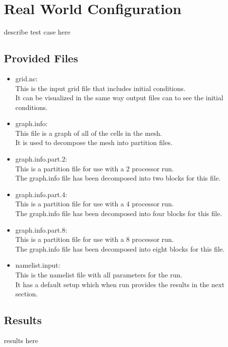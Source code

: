 \section{Real World Configuration}
\label{sec:realWorld_description}
describe test case here

\subsection{Provided Files}
\label{subsec:realWorld_files}

\begin{itemize}
	\item grid.nc: \\
		This is the input grid file that includes initial conditions.  \\
		It can be visualized in the same way output files can to see the initial conditions.
	\item graph.info: \\
		This file is a graph of all of the cells in the mesh. \\
		It is used to decompose the mesh into partition files.
	\item graph.info.part.2: \\
		This is a partition file for use with a 2 processor run. \\
		The graph.info file has been decomposed into two blocks for this file.
	\item graph.info.part.4: \\
		This is a partition file for use with a 4 processor run. \\
		The graph.info file has been decomposed into four blocks for this file.
	\item graph.info.part.8: \\
		This is a partition file for use with a 8 processor run. \\
		The graph.info file has been decomposed into eight blocks for this file.
	\item namelist.input: \\
		This is the namelist file with all parameters for the run. \\
		It has a default setup which when run provides the results in the next section.
\end{itemize}

\subsection{Results}
\label{subsecc:realWorld_results}
results here
